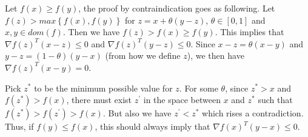 \documentclass[12pt] {article}
\begin{document}
Let $f(x)\geq f(y)$, the proof by contraindication goes as following. Let $f(z)> max \left\lbrace f(x),f(y) \right\rbrace$ for $z = x + \theta(y-z)$, $\theta \in [0,1]$ and $x,y \in dom(f)$. Then we have $f(z)>f(x)\geq f(y)$. This implies that $\nabla f(z)^{T}(x-z)\leq 0$ and $\nabla f(z)^{T}(y-z)\leq 0$. Since $x-z=\theta (x-y)$ and $y-z = (1-\theta)(y-x)$ (from how we define $z$), we then have $\nabla f(z)^{T}(x-y)=0$. 

Pick $z^{*}$ to be the minimum possible value for $z$. For some $\theta$, since $z^{*} > x$ and $f(z^{*})>f(x)$, there must exist 
$z^{\prime}$ in the space between $x$ and $z^{*}$ such that $f(z^{*}) >f(z^{\prime}) >f(x)$. But also we have $z^{\prime}<z^{*}$ which rises a contradiction. Thus, if $f(y)\leq f(x)$, this should always imply that $\nabla f(x)^{T}(y-x)\leq 0$. 

\end{document}
